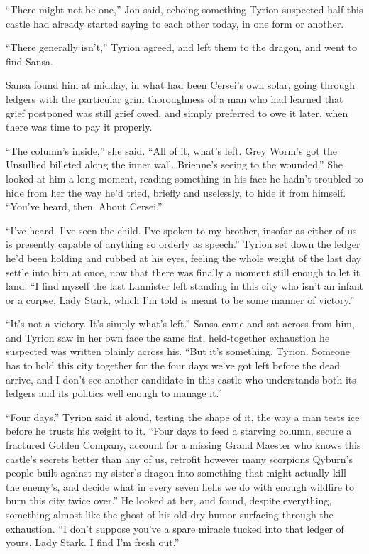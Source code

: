 “There might not be one,” Jon said, echoing something Tyrion suspected half this castle had already started saying to each other today, in one form or another.

“There generally isn’t,” Tyrion agreed, and left them to the dragon, and went to find Sansa.

\sceneBreak

Sansa found him at midday, in what had been Cersei’s own solar, going through ledgers with the particular grim thoroughness of a man who had learned that grief postponed was still grief owed, and simply preferred to owe it later, when there was time to pay it properly.

“The column’s inside,” she said. “All of it, what’s left. Grey Worm’s got the Unsullied billeted along the inner wall. Brienne’s seeing to the wounded.” She looked at him a long moment, reading something in his face he hadn’t troubled to hide from her the way he’d tried, briefly and uselessly, to hide it from himself. “You’ve heard, then. About Cersei.”

“I’ve heard. I’ve seen the child. I’ve spoken to my brother, insofar as either of us is presently capable of anything so orderly as speech.” Tyrion set down the ledger he’d been holding and rubbed at his eyes, feeling the whole weight of the last day settle into him at once, now that there was finally a moment still enough to let it land. “I find myself the last Lannister left standing in this city who isn’t an infant or a corpse, Lady Stark, which I’m told is meant to be some manner of victory.”

“It’s not a victory. It’s simply what’s left.” Sansa came and sat across from him, and Tyrion saw in her own face the same flat, held-together exhaustion he suspected was written plainly across his. “But it’s something, Tyrion. Someone has to hold this city together for the four days we’ve got left before the dead arrive, and I don’t see another candidate in this castle who understands both its ledgers and its politics well enough to manage it.”

“Four days.” Tyrion said it aloud, testing the shape of it, the way a man tests ice before he trusts his weight to it. “Four days to feed a starving column, secure a fractured Golden Company, account for a missing Grand Maester who knows this castle’s secrets better than any of us, retrofit however many scorpions Qyburn’s people built against my sister’s dragon into something that might actually kill the enemy’s, and decide what in every seven hells we do with enough wildfire to burn this city twice over.” He looked at her, and found, despite everything, something almost like the ghost of his old dry humor surfacing through the exhaustion. “I don’t suppose you’ve a spare miracle tucked into that ledger of yours, Lady Stark. I find I’m fresh out.”

